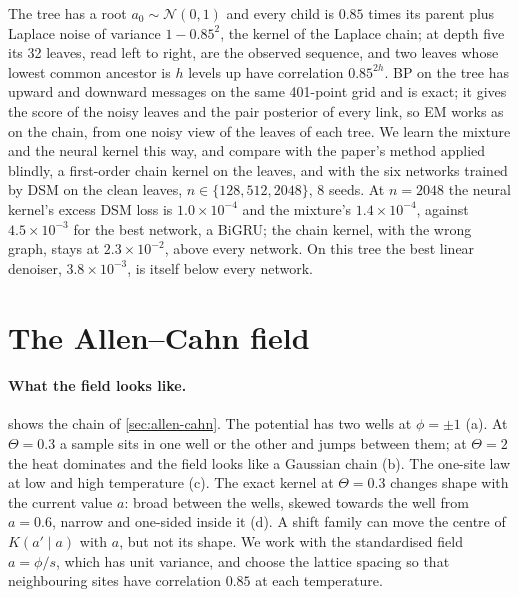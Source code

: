 \documentclass{article}
\begin{document}
The tree has a root $a_0\sim\mathcal N(0,1)$ and every child is $0.85$ times its parent plus Laplace noise of variance
$1-0.85^2$, the kernel of the Laplace chain; at depth five its 32 leaves, read left to right, are the observed sequence,
and two leaves whose lowest common ancestor is $h$ levels up have correlation $0.85^{2h}$. BP on the tree has upward and
downward messages on the same 401-point grid and is exact; it gives the score of the noisy leaves and the pair posterior
of every link, so EM works as on the chain, from one noisy view of the leaves of each tree. We learn the mixture and
the neural kernel this way, and compare with the paper's method applied blindly, a first-order chain kernel on the
leaves, and with the six networks trained by DSM on the clean leaves, $n\in\{128,512,2048\}$, 8 seeds. At $n=2048$ the
neural kernel's excess DSM loss is $1.0\times10^{-4}$ and the mixture's $1.4\times10^{-4}$, against $4.5\times10^{-3}$
for the best network, a BiGRU; the chain kernel, with the wrong graph, stays at $2.3\times10^{-2}$, above every
network. On this tree the best linear denoiser, $3.8\times10^{-3}$, is itself below every network.

\section{The Allen--Cahn field}
\label{app:field}

\paragraph{What the field looks like.}  shows the chain of \cref{sec:allen-cahn}. The potential has two
wells at $\phi=\pm1$ (a). At $\Theta=0.3$ a sample sits in one well or the other and jumps between them; at $\Theta=2$
the heat dominates and the field looks like a Gaussian chain (b). The one-site law at low and high temperature (c). The exact kernel at $\Theta=0.3$ changes shape with the current value
$a$: broad between the wells, skewed towards the well from $a=0.6$, narrow and one-sided inside it (d). A shift family
can move the centre of $K(a'\mid a)$ with $a$, but not its shape. We work with the standardised field $a=\phi/s$, which
has unit variance, and choose the lattice spacing so that neighbouring sites have correlation $0.85$ at each
temperature.
\end{document}
